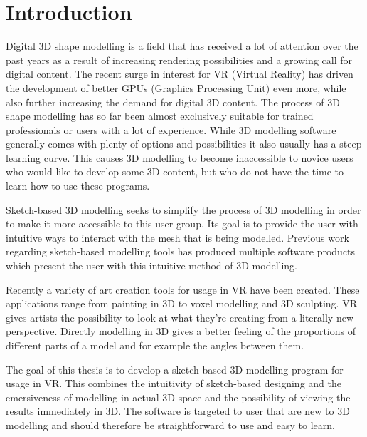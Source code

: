 \setcounter{chapter}{0}

\chapter{Introduction}
Digital 3D shape modelling is a field that has received a lot of attention over the past years as a result of increasing rendering possibilities and a growing call for digital content. The recent surge in interest for VR (Virtual Reality) has driven the development of better GPUs (Graphics Processing Unit) even more, while also further increasing the demand for digital 3D content. 
The process of 3D shape modelling has so far been almost exclusively suitable for trained professionals or users with a lot of experience. While 3D modelling software generally comes with plenty of options and possibilities it also usually has a steep learning curve. This causes 3D modelling to become inaccessible to novice users who would like to develop some 3D content, but who do not have the time to learn how to use these programs. 

Sketch-based 3D modelling seeks to simplify the process of 3D modelling in order to make it more accessible to this user group. Its goal is to provide the user with intuitive ways to interact with the mesh that is being modelled. Previous work regarding sketch-based modelling tools has produced multiple software products which  present the user with this intuitive method of 3D modelling. 

Recently a variety of art creation tools for usage in VR have been created. These applications range from painting in 3D to voxel modelling and 3D sculpting. VR gives artists the possibility to look at what they're creating from a literally new perspective. Directly modelling in 3D gives a better feeling of the proportions of different parts of a model and for example the angles between them.

The goal of this thesis is to develop a sketch-based 3D modelling program for usage in VR. This combines the intuitivity of sketch-based designing and the emersiveness of modelling in actual 3D space and the possibility of viewing the results immediately in 3D. The software is targeted to user that are new to 3D modelling and should therefore be straightforward to use and easy to learn.
